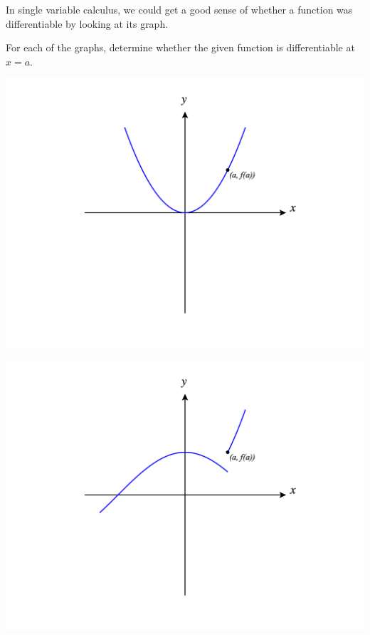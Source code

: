 \documentclass{ximera}
\begin{document}
In single variable calculus, we could get a good sense of whether a function was differentiable by looking at its graph.

\begin{problem}
For each of the graphs, determine whether the given function is differentiable at $x=a$.

\begin{image}
\includegraphics[width = \textwidth]{CalcPlot3D-sv_parabola}
\end{image}

\begin{multipleChoice}
\end{multipleChoice}

\begin{image}
\includegraphics[width = \textwidth]{CalcPlot3D-sv_jump}
\end{image}


\end{problem}
\end{document}
